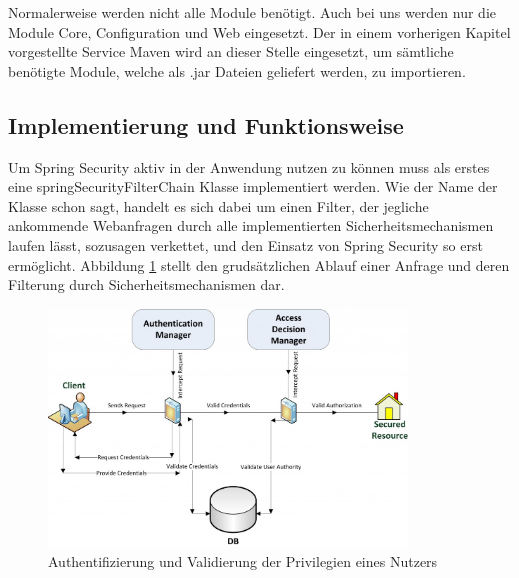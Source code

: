 Normalerweise werden nicht alle Module benötigt. Auch bei uns werden nur die Module Core, 
Configuration und Web eingesetzt. Der in einem vorherigen Kapitel vorgestellte Service Maven wird an 
dieser Stelle eingesetzt, um sämtliche benötigte Module, welche als .jar Dateien geliefert werden, zu 
importieren.

\subsection{Implementierung und Funktionsweise}

Um Spring Security aktiv in der Anwendung nutzen zu können muss als erstes eine springSecurityFilterChain 
Klasse implementiert werden. Wie der Name der Klasse schon sagt, handelt es sich dabei um einen Filter, der 
jegliche ankommende Webanfragen durch alle implementierten Sicherheitsmechanismen laufen lässt, sozusagen 
verkettet, und den Einsatz von Spring Security so erst ermöglicht. Abbildung \ref{fig:user_privileges} stellt den 
grudsätzlichen Ablauf einer Anfrage und deren Filterung durch Sicherheitsmechanismen dar.

\begin{figure}
    \centering
    \includegraphics[width=0.85\textwidth]{Graphics/security/user_privileges}
    \caption[Authentifizierung und Validierung der Privilegien eines Nutzers, Quelle: \cite{javabook:sec}]{Authentifizierung und Validierung der Privilegien eines Nutzers \cite{javabook:sec}}
   \label{fig:user_privileges}
\end{figure}

